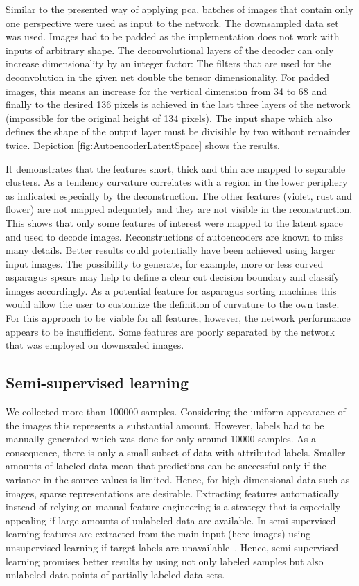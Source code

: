 Similar to the presented way of applying \acrshort{pca}, batches of images that contain only one perspective were used as input to the network. The downsampled data set was used. Images had to be padded as the implementation does not work with inputs of arbitrary shape. The deconvolutional layers of the decoder can only increase dimensionality by an integer factor: The filters that are used for the deconvolution in the given net double the tensor dimensionality. For padded images, this means an increase for the vertical dimension from 34 to 68 and finally to the desired 136 pixels is achieved in the last three layers of the network (impossible for the original height of 134 pixels). The input shape which also defines the shape of the output layer must be divisible by two without remainder twice. Depiction \autoref{fig:AutoencoderLatentSpace} shows the results.

\bigskip
It demonstrates that the features short, thick and thin are mapped to separable clusters. As a tendency curvature correlates with a region in the lower periphery as indicated especially by the deconstruction. The other features (violet, rust and flower) are not mapped adequately and they are not visible in the reconstruction. This shows that only some features of interest were mapped to the latent space and used to decode images. Reconstructions of autoencoders are known to miss many details. Better results could potentially have been achieved using larger input images. The possibility to generate, for example, more or less curved asparagus spears may help to define a clear cut decision boundary and classify images accordingly. As a potential feature for asparagus sorting machines this would allow the user to customize the definition of curvature to the own taste. For this approach to be viable for all features, however, the network performance appears to be insufficient. Some features are poorly separated by the network that was employed on downscaled images.


\subsection{Semi-supervised learning}
\label{sec:SemiSupervisedLearning}

We collected more than 100000 samples. Considering the uniform appearance of the images this represents a substantial amount. However, labels had to be manually generated which was done for only around 10000 samples. As a consequence, there is only a small subset of data with attributed labels. Smaller amounts of labeled data mean that predictions can be successful only if the variance in the source values is limited. Hence, for high dimensional data such as images, sparse representations are desirable. Extracting features automatically instead of relying on manual feature engineering is a strategy that is especially appealing if large amounts of unlabeled data are available. In semi-supervised learning features are extracted from the main input (here images) using unsupervised learning if target labels are unavailable~\citep{keng2017semi}. Hence, semi-supervised learning promises better results by using not only labeled samples but also unlabeled data points of partially labeled data sets.

